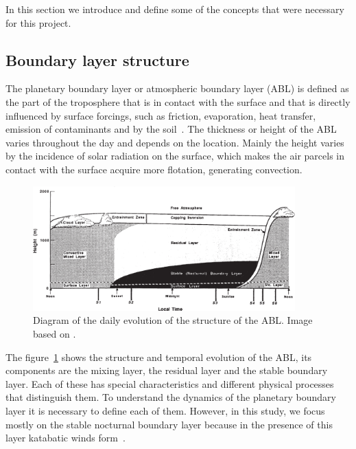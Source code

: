 In this section we introduce and define some of the concepts that were necessary for this project.

\subsection{Boundary layer structure}
The planetary boundary layer or atmospheric boundary layer (ABL) is defined as the part of the troposphere that is in contact with the surface and that is directly influenced by surface forcings, such as friction, evaporation, heat transfer, emission of contaminants and by the soil~\citep{stull2012introduction}. The thickness or height of the ABL varies throughout the day and depends on the location. Mainly the height varies by the incidence of solar radiation on the surface, which makes the air parcels in contact with the surface acquire more flotation, generating convection.

\begin{figure}[ht!]
	\vspace{-5pt}
    \centering
\includegraphics[width=0.9\textwidth]{fig/abl_stull.png}
    \caption{Diagram of the daily evolution of the structure of the ABL. Image based on \cite{stull2012introduction}.}
    \label{fig:ABL_structure}
  \vspace{-5pt}
\end{figure}

The figure~\ref{fig:ABL_structure} shows the structure and temporal evolution of the ABL, its components are the mixing layer, the residual layer and the stable boundary layer. Each of these has special characteristics and different physical processes that distinguish them. To understand the dynamics of the planetary boundary layer it is necessary to define each of them. However, in this study, we focus mostly on the stable nocturnal boundary layer because in the presence of this layer katabatic winds form~\citep{poulos2008observational, stull2012introduction}.

